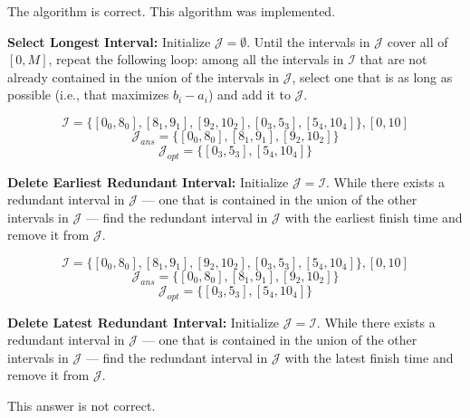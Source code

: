 \documentclass{hw}
\begin{document}
\begin{problem}
\begin{solution}
    The algorithm is correct. This algorithm was implemented. 
\end{solution}

  \begin{subproblem}
    \textbf{Select Longest Interval:}
  Initialize $\mathcal{J}=\emptyset$.
  Until the intervals in $\mathcal{J}$ cover all of $[0,M]$,
  repeat the following loop: among all the intervals in
  $\mathcal{I}$ that are not already contained in the union
  of the intervals in $\mathcal{J}$, select one that is as
  long as possible (i.e., that maximizes $b_i-a_i$) and
  add it to $\mathcal{J}$.
  \end{subproblem}

\begin{solution}
$$
\mathcal{I} = \{[0_0,8_0], [8_1,9_1], [9_2,10_2], [0_3,5_3], [5_4,10_4]\}, [0,10]
$$
$$
\mathcal{J}_{ans} = \{[0_0,8_0], [8_1,9_1], [9_2,10_2]\}
$$
$$
\mathcal{J}_{opt} = \{[0_3,5_3], [5_4,10_4]\}
$$
\end{solution}

  \begin{subproblem}
    \textbf{Delete Earliest Redundant Interval:}
  Initialize $\mathcal{J}=\mathcal{I}$. While there
  exists a redundant interval in $\mathcal{J}$ --- one
  that is contained in the union of the other intervals
  in $\mathcal{J}$ --- find the redundant interval in
  $\mathcal{J}$ with the earliest finish time and
  remove it from $\mathcal{J}$.
\end{subproblem}

\begin{solution}
$$
\mathcal{I} = \{[0_0,8_0], [8_1,9_1], [9_2,10_2], [0_3,5_3], [5_4,10_4]\}, [0,10]
$$
$$
\mathcal{J}_{ans} = \{[0_0,8_0], [8_1,9_1], [9_2,10_2]\}
$$
$$
\mathcal{J}_{opt} = \{[0_3,5_3], [5_4,10_4]\}
$$
\end{solution}
    
\begin{subproblem}
    \textbf{Delete Latest Redundant Interval:}
  Initialize $\mathcal{J}=\mathcal{I}$. While there
  exists a redundant interval in $\mathcal{J}$ --- one
  that is contained in the union of the other intervals
  in $\mathcal{J}$ --- find the redundant interval in
  $\mathcal{J}$ with the latest finish time and remove it
  from $\mathcal{J}$.
\end{subproblem}

\begin{solution}
This answer is not correct.


\end{solution}
\end{problem}
\end{document}
